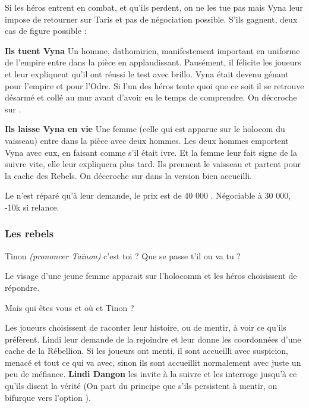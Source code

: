 Si les héros entrent en combat, et qu'ils perdent, on ne les tue pas mais Vyna leur impose de retourner sur Taris et pas de négociation possible. S'ils gagnent, deux cas de figure possible :
\begin{rebelist}
    \item \textbf{Ils tuent Vyna} Un homme, dathomirien, manifestement important en uniforme de l'empire entre dans la pièce en applaudissant. Pausément, il félicite les joueurs et   leur expliquent qu'il ont réussi le test avec brillo. Vyna était devenu génant pour l'empire et pour l'Odre. Si l'un des héros tente quoi que ce soit il se retrouve désarmé et collé au mur avant d'avoir eu le temps de comprendre. On déccroche sur .

    \item \textbf{Ils laisse Vyna en vie} Une femme (celle qui est apparue sur le holocom du vaisseau) entre dans la pièce avec deux hommes. Les deux hommes emportent Vyna avec eux, en faisant comme s'il était ivre. Et la femme leur fait signe de la suivre vite, elle leur expliquera plus tard. Ils prennent le vaisseau et partent pour la cache des Rebels. On déccroche sur  dans la version bien accueilli.
\end{rebelist}

Le  n'est réparé qu'à leur demande, le prix est de 40 000 \crg. Négociable à 30 000, -10k si relance.


\subsubsection{Les rebels} \label{sec:les-rebels}

\begin{quotebox}
    Tinon \emph{(prononcer Taïnon)} c’est toi ? Que se passe t’il ou va tu ?
\end{quotebox}

Le visage d’une jeune femme apparait sur l’holocomm et les héros choisissent de répondre.

\begin{quotebox}
    Mais qui êtes vous et où et Tinon ?
\end{quotebox}
Les joueurs choisissent de raconter leur histoire, ou de mentir, à voir ce qu'ils préfèrent. Lindi leur demande de la rejoindre et leur donne les coordonnées d'une cache de la Rébellion. Si les joueurs ont menti, il sont accueilli avec suspicion, menacé et tout ce qui va avec, sinon ils sont accueillit normalement avec juste un peu de méfiance. \textbf{Lindi Dangon} les invite à la suivre et les interroge jusqu'à ce qu'ils disent la vérité (On part du principe que s'ils persistent à mentir, on bifurque vers l'option ).

